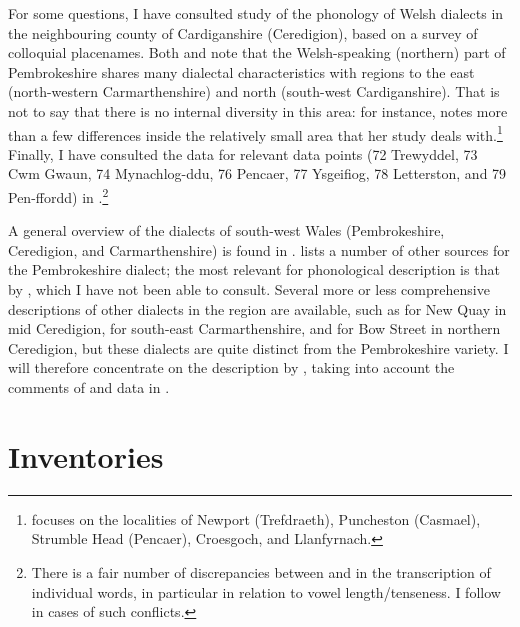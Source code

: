 For some questions, I have consulted  study of the phonology of Welsh dialects in the neighbouring county of Cardiganshire (Ceredigion), based on a survey of colloquial placenames. Both \citet[p.~4]{awbery86:_pembr_welsh} and \citet[p.~66 \emph{sqq.}]{wmffre03:_languag_wales} note that the Welsh-speaking (northern) part of Pembrokeshire shares many dialectal characteristics with regions to the east (north-western Carmarthenshire) and north (south-west Cardiganshire). That is not to say that there is  no internal diversity in this area: for instance, \citet{awbery86:_pembr_welsh} notes more than a few differences inside the relatively small area that her study deals with.\footnote{\citet{awbery86:_pembr_welsh} focuses on the localities of Newport (Trefdraeth), Puncheston (Casmael), Strumble Head (Pencaer), Croesgoch, and Llanfyrnach.} Finally, I have consulted the data for relevant data points (72 Trewyddel, 73 Cwm Gwaun, 74 Mynachlog-ddu, 76 Pencaer, 77 Ysgeifiog, 78 Letterston, and 79 Pen-ffordd) in \citet{thomas00:_welsh}.\footnote{There is a fair number of discrepancies between \citet{awbery86:_pembr_welsh} and \citet{thomas00:_welsh} in the transcription of individual words, in particular in relation to vowel length\fshyp tenseness. I follow \citet{awbery86:_pembr_welsh} in cases of such conflicts.}

A general overview of the dialects of south-west Wales (Pembrokeshire, Ceredigion, and Carmarthenshire) is found in \citet{jones92:_dyfed}. \citet{awbery86:_pembr_welsh} lists a number of other sources for the Pembrokeshire dialect; the most relevant for phonological description is that by \citet{jones67:_welsh}, which I have not been able to consult. Several more or less comprehensive descriptions of other dialects in the region are available, such as \citet{davies34:_astud_gymraeg_ceinew} for New Quay in mid Ceredigion, \citet{thorne76:_astud_carnw_sir_gaerf} for south-east Carmarthenshire, and \citet{pilch57:_lauts,pilch-nasal,pilch75:_advan_welsh} for Bow Street in northern Ceredigion, but these dialects are quite distinct from the Pembrokeshire variety. I will therefore concentrate on the description by \citet{awbery86:_pembr_welsh}, taking into account the comments of \citet{wmffre03:_languag_wales} and data in \citet{thomas00:_welsh}.

\section{Inventories}
\label{sec:invent-struct}

